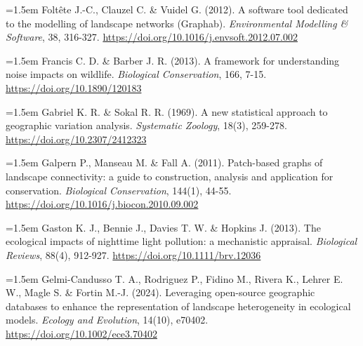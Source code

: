 \documentclass[a4paper,12pt]{report}
\begin{document}
\noindent\hangindent=1.5em Foltête J.-C., Clauzel C. \& Vuidel G. (2012). A software tool dedicated to the modelling of landscape networks (Graphab). \textit{Environmental Modelling \& Software}, 38, 316-327. \url{https://doi.org/10.1016/j.envsoft.2012.07.002}\par\medskip
\noindent\hangindent=1.5em Francis C. D. \& Barber J. R. (2013). A framework for understanding noise impacts on wildlife. \textit{Biological Conservation}, 166, 7-15. \url{https://doi.org/10.1890/120183}\par\medskip
\noindent\hangindent=1.5em Gabriel K. R. \& Sokal R. R. (1969). A new statistical approach to geographic variation analysis. \textit{Systematic Zoology}, 18(3), 259-278. \url{https://doi.org/10.2307/2412323}\par\medskip
\noindent\hangindent=1.5em Galpern P., Manseau M. \& Fall A. (2011). Patch-based graphs of landscape connectivity: a guide to construction, analysis and application for conservation. \textit{Biological Conservation}, 144(1), 44-55. \url{https://doi.org/10.1016/j.biocon.2010.09.002}\par\medskip
\noindent\hangindent=1.5em Gaston K. J., Bennie J., Davies T. W. \& Hopkins J. (2013). The ecological impacts of nighttime light pollution: a mechanistic appraisal. \textit{Biological Reviews}, 88(4), 912-927. \url{https://doi.org/10.1111/brv.12036}\par\medskip
\noindent\hangindent=1.5em Gelmi-Candusso T. A., Rodriguez P., Fidino M., Rivera K., Lehrer E. W., Magle S. \& Fortin M.-J. (2024). Leveraging open-source geographic databases to enhance the representation of landscape heterogeneity in ecological models. \textit{Ecology and Evolution}, 14(10), e70402. \url{https://doi.org/10.1002/ece3.70402}\par\medskip
\end{document}
